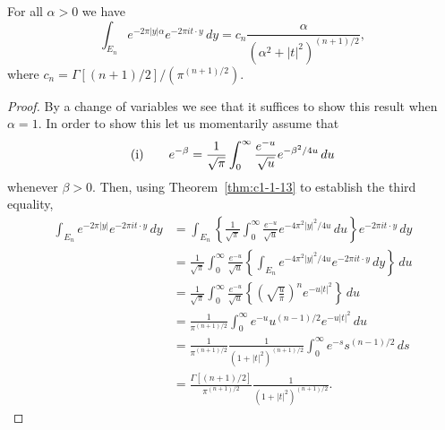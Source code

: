 \begin{theorem}\label{thm:c1-1-14}
For all $\alpha > 0$ we have
\[
\int_{E_{n}}e^{-2\pi|y|\alpha}e^{-2\pi i t\cdot y}\,dy
=c_{n}\frac{\alpha}{(\alpha^{2}+|t|^{2})^{(n+1)/2}},
\]
where $c_{n} = \Gamma[(n + 1)/2]/(\pi^{(n+1)/2})$.
\end{theorem}

\begin{proof}
By a change of variables we see that it suffices to show this result when
$\alpha = 1$. In order to show this let us momentarily assume that
\[
\textup{(i)}\qquad
e^{-\beta}=\frac{1}{\sqrt{\pi}}\int_{0}^{\infty}\frac{e^{-u}}{\sqrt{u}}e^{-\beta^{2}/4u}\,du
\]
whenever $\beta > 0$. Then, using Theorem~\ref{thm:c1-1-13} to establish the
third equality,
\begin{align*}
\int_{E_{n}}e^{-2\pi|y|}e^{-2\pi i t\cdot y}\,dy
&=\int_{E_{n}}\left\{\frac{1}{\sqrt{\pi}}\int_{0}^{\infty}\frac{e^{-u}}{\sqrt{u}}e^{-4\pi^{2}|y|^{2}/4u}\,du\right\}e^{-2\pi i t\cdot y}\,dy\\
&=\frac{1}{\sqrt{\pi}}\int_{0}^{\infty}\frac{e^{-u}}{\sqrt{u}}\left\{\int_{E_{n}}e^{-4\pi^{2}|y|^{2}/4u}e^{-2\pi i t\cdot y}\,dy\right\}\,du\\
&=\frac{1}{\sqrt{\pi}}\int_{0}^{\infty}\frac{e^{-u}}{\sqrt{u}}\left\{\left(\sqrt{\frac{u}{\pi}}\right)^{n}e^{-u|t|^{2}}\right\}\,du\\
&=\frac{1}{\pi^{(n+1)/2}}\int_{0}^{\infty}e^{-u}u^{(n-1)/2}e^{-u|t|^{2}}\,du\\
&=\frac{1}{\pi^{(n+1)/2}}\frac{1}{(1+|t|^{2})^{(n+1)/2}}\int_{0}^{\infty}e^{-s}s^{(n-1)/2}\,ds\\
&=\frac{\Gamma[(n+1)/2]}{\pi^{(n+1)/2}}\frac{1}{(1+|t|^{2})^{(n+1)/2}}.
\end{align*}


\end{proof}
